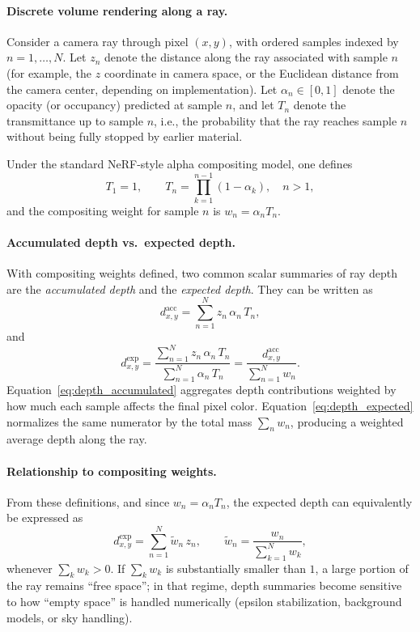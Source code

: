\documentclass{report}
\begin{document}
\paragraph{Discrete volume rendering along a ray.}
Consider a camera ray through pixel $(x,y)$, with ordered samples indexed by $n=1,\dots,N$. Let $z_n$ denote the distance along the ray associated with sample $n$ (for example, the $z$ coordinate in camera space, or the Euclidean distance from the camera center, depending on implementation). Let $\alpha_n\in[0,1]$ denote the opacity (or occupancy) predicted at sample $n$, and let $T_n$ denote the transmittance up to sample $n$, i.e., the probability that the ray reaches sample $n$ without being fully stopped by earlier material.

Under the standard NeRF-style alpha compositing model, one defines
\[
T_1=1,\qquad
T_n=\prod_{k=1}^{n-1}(1-\alpha_k),\quad n>1,
\]
and the compositing weight for sample $n$ is $w_n=\alpha_n T_n$.

\paragraph{Accumulated depth vs.\ expected depth.}
With compositing weights defined, two common scalar summaries of ray depth are the \emph{accumulated depth} and the \emph{expected depth}. They can be written as
\begin{equation}
d_{x,y}^{\mathrm{acc}}=\sum_{n=1}^{N} z_n\,\alpha_n\,T_n,
\label{eq:depth_accumulated}
\end{equation}
and
\begin{equation}
d_{x,y}^{\mathrm{exp}}=
\frac{\sum_{n=1}^{N} z_n\,\alpha_n\,T_n}{\sum_{n=1}^{N} \alpha_n\,T_n}
=
\frac{d_{x,y}^{\mathrm{acc}}}{\sum_{n=1}^{N} w_n}.
\label{eq:depth_expected}
\end{equation}
Equation~\eqref{eq:depth_accumulated} aggregates depth contributions weighted by how much each sample affects the final pixel color. Equation~\eqref{eq:depth_expected} normalizes the same numerator by the total mass $\sum_n w_n$, producing a weighted average depth along the ray.

\paragraph{Relationship to compositing weights.}
From these definitions, and since $w_n=\alpha_n T_n$, the expected depth can equivalently be expressed as
\[
d_{x,y}^{\mathrm{exp}}=\sum_{n=1}^{N} \tilde{w}_n\, z_n,
\qquad
\tilde{w}_n=\frac{w_n}{\sum_{k=1}^{N} w_k},
\]
whenever $\sum_k w_k>0$. If $\sum_k w_k$ is substantially smaller than $1$, a large portion of the ray remains ``free space''; in that regime, depth summaries become sensitive to how ``empty space'' is handled numerically (epsilon stabilization, background models, or sky handling).
\end{document}

